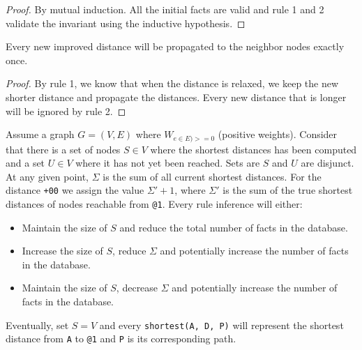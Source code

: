 \begin{proof}
By mutual induction. All the initial facts are valid and rule 1 and 2 validate the
invariant using the inductive hypothesis.
\end{proof}

\begin{lemma}[Relaxation]
Every new improved distance will be propagated to the neighbor nodes exactly once.
\end{lemma}
\begin{proof}
By rule 1, we know that when the distance is relaxed, we keep the new shorter
distance and propagate the distances. Every new distance that is longer will be
ignored by rule 2.
\end{proof}

\begin{theorem}[Correctness]

   Assume a graph $G = (V, E)$ where $W_{e \in E) >= 0}$ (positive weights).
   Consider that there is a set of nodes $S \in V$ where the shortest distances
   has been computed and a set $U \in V$ where it has not yet been reached.
   Sets are $S$ and $U$ are disjunct. At any given point, $\Sigma$ is the sum of
   all current shortest distances. For the distance \texttt{+00} we assign the
   value $\Sigma' + 1$, where $\Sigma'$ is the sum of the true shortest
   distances of nodes reachable from \texttt{@1}.  Every rule inference will
   either:

   \begin{itemize}
      \item Maintain the size of $S$ and reduce the total number of facts in
         the database.
      \item Increase the size of $S$, reduce $\Sigma$ and potentially increase the number of
         facts in the database.
      \item Maintain the size of $S$, decrease $\Sigma$
         and potentially increase the number of facts in the database.
   \end{itemize}

   Eventually, set $S = V$ and every \texttt{shortest(A, D, P)} will represent
   the shortest distance from \texttt{A} to \texttt{@1} and \texttt{P} is its
   corresponding path.
\end{theorem}

